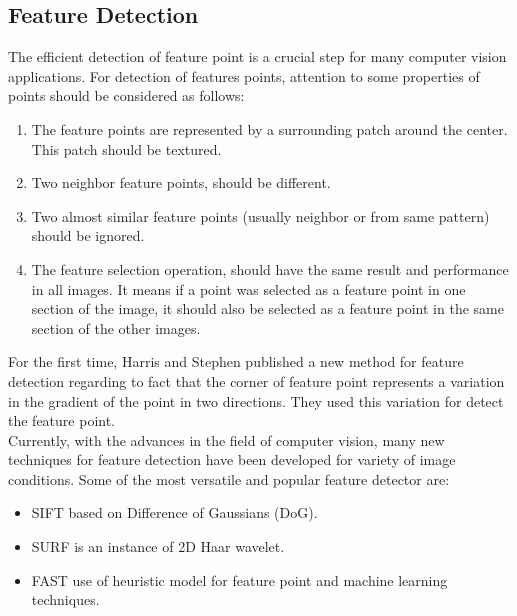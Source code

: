 \subsection{Feature Detection} \label{subsec:feature_detection}
 The efficient detection of feature point is a crucial step for many computer vision applications. For detection of features points, attention to some properties of points should be considered as follows: \cite{forstner1986feature}
\begin{enumerate}
  \item The feature points are represented by a surrounding patch around the center. This patch should be textured.
  \item Two neighbor feature points, should be different.
  \item Two almost similar feature points (usually neighbor or from same pattern) should be ignored.
  \item The feature selection operation, should have the same result and performance in all images. It means if a point was selected as a feature point in one section of the image, it should also be selected as a feature point in the same section of the other images.
\end{enumerate}
For the first time, Harris and Stephen \cite{harris1988combined} published a new method for feature detection regarding to fact that the corner of feature point represents a variation in the gradient of the point in two directions. They used this variation for detect the feature point.\\
Currently, with the advances in the field of computer vision, many new techniques for feature detection have been developed for variety of image conditions. Some of the most versatile and popular feature detector are:
\begin{itemize}
\item SIFT \cite{lowe2004distinctive} based on Difference of Gaussians (DoG).
\item SURF \cite{bay2006surf} is an instance of 2D Haar wavelet.
\item FAST \cite{rosten2010faster} use of heuristic model for feature point and machine learning techniques.
\end{itemize}

